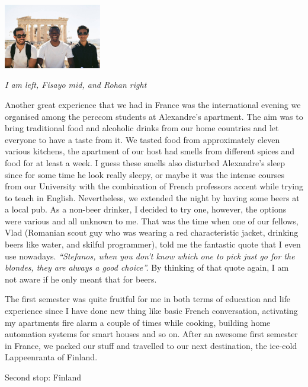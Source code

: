 \documentclass[10pt,a4paper]{article} %
\newcommand{\NewsItem}[1]{ %
\usefont{T1}{fvs}{n}{n} %
\vspace{24pt}\large #1\vspace{3pt} %
\par \normalsize \normalfont}
\begin{document}
\begin{multicols}{3}
\begin{center}
	\includegraphics[width=0.32\textwidth]{media/stef_fisayo_rohan.jpg}
	\par\textit{I am left, Fisayo mid, and Rohan right}
\end{center}


Another great experience that we had in France was the international evening 
we organised among the {\sc perccom} students at Alexandre's apartment. 
The aim was to bring traditional food and alcoholic drinks from our home countries 
and let everyone to have a taste from it. 
We tasted food from approximately eleven various kitchens, the apartment of our 
host had smells from different spices and food for at least a week. 
I guess these smells also disturbed Alexandre's sleep since for some time he look 
really sleepy, or maybe it was the intense courses from our University with the 
combination of French professors accent while trying to teach in English.  
Nevertheless, we extended the night by having some beers at a local pub. 
As a non-beer drinker, I decided to try one, however, the options were various 
and all unknown to me. 
That was the time when one of our fellows, Vlad (Romanian scout guy who was wearing a 
red characteristic jacket, drinking beers like water, and skilful programmer), 
told me the fantastic quote that I even use nowadays. 
\textit{``Stefanos, when you don't know which one to pick just go for the blondes, 
	they are always a good choice''.} 
By thinking of that quote again, I am not aware if he only meant that for beers.


The first semester was quite fruitful for me in both terms of education and 
life experience since I have done new thing like basic French conversation, 
activating my apartments fire alarm a couple of times while cooking, building home 
automation systems for smart houses and so on. 
After an awesome first semester in France, we packed our stuff and travelled 
to our next destination, the ice-cold Lappeenranta of Finland.


\NewsItem{Second stop: Finland}


\end{multicols}
\end{document}
